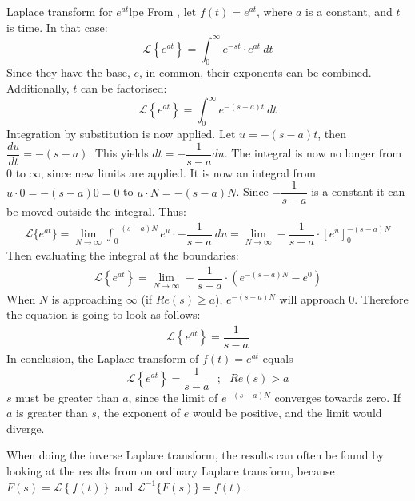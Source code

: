 \begin{example}{Laplace transform for $e^{at}$}{lpe}
From , let $f(t)=e^{at}$, where $a$ is a constant, and $t$ is time. In that case:
$$\mathcal{L} \left\{e^{at} \right\}=\int_{0}^{\infty} e^{-st}\cdot e^{at}\ dt$$
Since they have the base, $e$, in common, their exponents can be combined. Additionally, $t$ can be factorised:
$$\mathcal{L} \left\{e^{at} \right\}=\int_{0}^{\infty} e^{-(s-a)t}\ dt$$
Integration by substitution is now applied. Let $u = -(s-a)t$, then $\dfrac{du}{dt}=-(s-a)$. This yields $dt=-\dfrac{1}{s-a}du$. The integral is now no longer from 0 to $\infty$, since new limits are applied. It is now an integral from $u \cdot 0=-(s-a)0=0$ to $u\cdot N=-(s-a)N$. Since $-\dfrac{1}{s-a}$ is a constant it can be moved outside the integral. Thus:
\begin{align}
\mathcal{L}\{e^{at}\}=\lim_{N \to \infty} \int_{0}^{-(s-a)N} e^{u}\cdot -\dfrac{1}{s-a}\ du = \lim_{N \to \infty} -\dfrac{1}{s-a} \cdot \left[e^{u} \right]_{0}^{-(s-a)N}
\label{eq6.2}
\end{align}
Then evaluating the integral at the boundaries:
\begin{align*}
\mathcal{L} \left\{e^{at} \right\} =\lim_{N \to \infty} -\dfrac{1}{s-a}\cdot (e^{-(s-a)N}-e^{0})
\end{align*}
When $N$ is approaching $\infty$ (if $Re(s) \geq a$), $e^{-(s-a)N}$ will approach $0$. Therefore the equation is going to look as follows:
\begin{align}
\mathcal{L} \left\{e^{at} \right\} = \dfrac{1}{s-a}
\end{align}
In conclusion, the Laplace transform of $f(t)=e^{at}$ equals
$$\mathcal{L} \left\{e^{at} \right\} =\dfrac{1}{s-a} \ \ \ ;\ \ \ Re(s)>a$$
$s$ must be greater than $a$, since the limit of $e^{-(s-a)N}$ converges towards zero. If $a$ is greater than $s$, the exponent of $e$ would be positive, and the limit would diverge.
\end{example}
\noindent When doing the inverse Laplace transform, the results can often be found by looking at the results from on ordinary Laplace transform, because $F(s) = \mathcal{L}\left\{f(t)\right\}$ and $\mathcal{L}^{-1}\big\{ F(s)\big\} = f(t)$.
